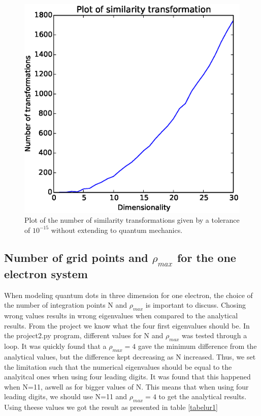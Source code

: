 \documentclass{article}
\begin{document}
\begin{figure}
  \includegraphics{simtransformations.eps}
  \caption{Plot of the number of similarity transformations given by a tolerance of $10^{-15}$ without extending to quantum mechanics.}
  \label{simtrans}
\end{figure}





\subsection{Number of grid points and $\rho_{max}$ for the one electron system}

When modeling quantum dots in three dimension for one electron, the choice of the number of integration points N and $\rho_{max}$ is important to discuss. Chosing wrong values results in wrong eigenvalues when compared to the analytical results. From the project we know what the four first eigenvalues should be. In the project2.py program, different values for N and $\rho_{max}$ was tested through a loop.
It was quickly found that a $\rho_{max}=4$ gave the minimum difference from the analytical values, but the difference kept decreasing as N increased. Thus, we set the limitation such that the numerical eigenvalues should be equal to the analyitcal ones when using four leading digits. It was found that this happened when N=11, aswell as for bigger values of N. This means that when using four leading digits, we should use N=11 and $\rho_{max}=4$ to get the analytical results. Using theese values we got the result as presented in table \ref{tabelur1}
\end{document}

